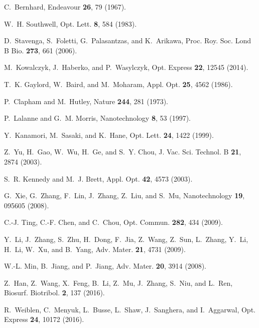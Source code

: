 \documentclass[9pt,twocolumn,twoside]{osajnl}
\begin{document}
\begin{thebibliography}{10}
	\newcommand{\enquote}[1]{``#1''}
	
	C.~Bernhard, Endeavour \textbf{26}, 79 (1967).
	
	W.~H. Southwell, Opt. Lett. \textbf{8}, 584 (1983).
	
	D.~Stavenga, S.~Foletti, G.~Palasantzas, and K.~Arikawa, Proc. Roy. Soc. Lond B
	Bio. \textbf{273}, 661 (2006).
	
	M.~Kowalczyk, J.~Haberko, and P.~Wasylczyk, Opt. Express \textbf{22}, 12545
	(2014).
	
	T.~K. Gaylord, W.~Baird, and M.~Moharam, Appl. Opt. \textbf{25}, 4562 (1986).
	
	P.~Clapham and M.~Hutley, Nature \textbf{244}, 281 (1973).
	
	P.~Lalanne and G.~M. Morris, Nanotechnology \textbf{8}, 53 (1997).
	
	Y.~Kanamori, M.~Sasaki, and K.~Hane, Opt. Lett. \textbf{24}, 1422 (1999).
	
	Z.~Yu, H.~Gao, W.~Wu, H.~Ge, and S.~Y. Chou, J. Vac. Sci. Technol. B
	\textbf{21}, 2874 (2003).
	
	S.~R. Kennedy and M.~J. Brett, Appl. Opt. \textbf{42}, 4573 (2003).
	
	G.~Xie, G.~Zhang, F.~Lin, J.~Zhang, Z.~Liu, and S.~Mu, Nanotechnology
	\textbf{19}, 095605 (2008).
	
	C.-J. Ting, C.-F. Chen, and C.~Chou, Opt. Commun. \textbf{282}, 434 (2009).
	
	Y.~Li, J.~Zhang, S.~Zhu, H.~Dong, F.~Jia, Z.~Wang, Z.~Sun, L.~Zhang, Y.~Li,
	H.~Li, W.~Xu, and B.~Yang, Adv. Mater. \textbf{21}, 4731 (2009).
	
	W.-L. Min, B.~Jiang, and P.~Jiang, Adv. Mater. \textbf{20}, 3914 (2008).
	
	Z.~Han, Z.~Wang, X.~Feng, B.~Li, Z.~Mu, J.~Zhang, S.~Niu, and L.~Ren, Biosurf.
	Biotribol. \textbf{2}, 137 (2016).
	
	R.~Weiblen, C.~Menyuk, L.~Busse, L.~Shaw, J.~Sanghera, and I.~Aggarwal, Opt.
	Express \textbf{24}, 10172 (2016).
	

\end{thebibliography}
\end{document}
